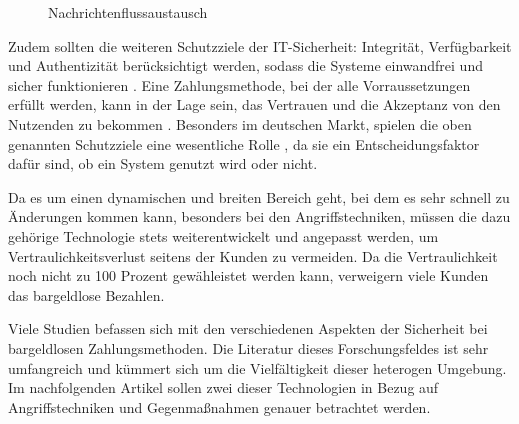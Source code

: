 \vfill
\begin{figure}[H]
    \caption{Nachrichtenflussaustausch \cite{refart:JTAS}}
    \label{fig:refart:JTAS_2}
\end{figure}
\vfill


Zudem sollten die weiteren Schutzziele der IT-Sicherheit: Integrität, Verfügbarkeit und Authentizität
berücksichtigt werden, sodass die Systeme einwandfrei und sicher funktionieren \cite{refip:GMPS}. 
Eine Zahlungsmethode, bei der alle Vorraussetzungen erfüllt werden, kann in der Lage sein, das Vertrauen 
und die Akzeptanz von den Nutzenden zu bekommen \cite{refart:HARE}. Besonders im deutschen Markt, spielen
die oben genannten Schutzziele eine wesentliche Rolle \cite{refip:DKAM}, da sie ein Entscheidungsfaktor 
dafür sind, ob ein System genutzt wird oder nicht.


Da es um einen dynamischen und breiten Bereich geht, bei dem es sehr schnell zu Änderungen kommen kann, 
besonders bei den Angriffstechniken, müssen die dazu gehörige \cite{refip:NYRS} Technologie stets 
weiterentwickelt und angepasst werden, um Vertraulichkeitsverlust seitens der Kunden zu vermeiden. 
Da die Vertraulichkeit noch nicht zu 100 Prozent gewähleistet werden kann, verweigern viele Kunden
das bargeldlose Bezahlen.


Viele Studien befassen sich mit den verschiedenen Aspekten der Sicherheit bei bargeldlosen Zahlungsmethoden.
Die Literatur dieses Forschungsfeldes ist sehr umfangreich und kümmert sich um die Vielfältigkeit 
dieser heterogen \cite{refip:GMPS} Umgebung. Im nachfolgenden Artikel sollen zwei dieser Technologien 
in Bezug auf Angriffstechniken und Gegenmaßnahmen genauer betrachtet werden.

